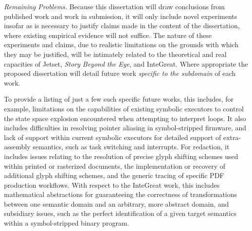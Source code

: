 \emph{Remaining Problems.} Because this dissertation will draw conclusions from published work and work in submission, it will only include novel experiments insofar as is necessary to justify claims made in the content of the dissertation, where existing empirical evidence will not suffice.
The nature of these experiments and claims, due to realistic limitations on the grounds with which they may be justified, will be intimately related to the theoretical and real capacities of Jetset, \emph{Story Beyond the Eye}, and InteGreat.
Where appropriate the proposed dissertation will detail future work \emph{specific to the subdomain} of each work.

To provide a listing of just a few such specific future works, this includes, for example, limitations on the capabilities of existing symbolic executors to control the state space explosion encountered when attempting to interpret loops. 
It also includes difficulties in resolving pointer aliasing in symbol-stripped firmware, and lack of support within current symbolic executors for detailed support of extra-assembly semantics, such as task switching and interrupts. 
For redaction, it includes issues relating to the resolution of precise glyph shifting schemes used within printed or rasterized documents, the implementation or recovery of additional glyph shifting schemes, and the generic tracing of specific PDF production workflows.
With respect to the InteGreat work, this includes mathematical abstractions for guaranteeing the correctness of transformations between one semantic domain and an arbitrary, more abstract domain, and subsidiary issues, such as the perfect identification of a given target semantics within a symbol-stripped binary program.
